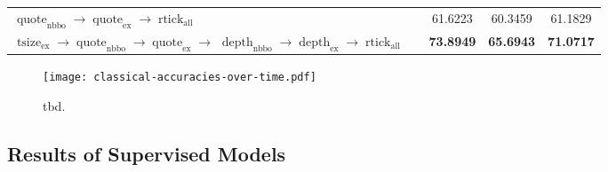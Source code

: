 \begin{table}
\begin{tabular}{llSSS}
        $\operatorname{quote}_{\mathrm{nbbo}} \to \operatorname{quote}_{\mathrm{ex}} \to \operatorname{rtick}_{\mathrm{all}}$ &                  & 61.6223                            & 60.3459 & 61.1829 \\
         & & \bfseries 73.8949 & \bfseries 65.6943 & \bfseries 71.0717 \\\bottomrule
    \end{tabular}
\end{table}

\begin{figure}[ht]
    \centering
    \texttt{[image: classical-accuracies-over-time.pdf]}
    \caption[tbd]{tbd.}
    \label{fig:classical-accuracies-over-time}
\end{figure}

\subsection{Results of Supervised
    Models}\label{sec:results-of-supervised-models}

